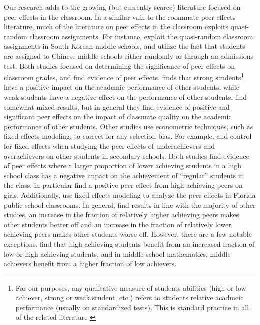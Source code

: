 \documentclass[12pt,letterpaper,english,fleqn,titlepage]{article}
\begin{document}
Our research adds to the growing (but currently scarce) literature focused on peer effects in the classroom.
In a similar vain to the roommate peer effects literature, much of the literature on peer effects in the classroom exploits quasi-random classroom assignments.
For instance, \citet{kang2007classroom} exploit the quasi-random classroom assignments in South Korean middle schools, and \citet{carman2012classroom} utilize the fact that students are assigned to Chinese middle schools either randomly or through an admissions test.
Both studies focused on determining the significance of peer effects on classroom grades, and find evidence of peer effects.
\citeauthor{kang2007classroom} finds that strong students\footnote{For our purposes, any qualitative measure of students abilities (high or low achiever, strong or weak student, etc.) refers to students relative acadmeic performance (usually on standardized tests). This is standard practice in all of the related literature \citep{carman2012classroom,burke2013classroom,kang2007classroom,schlosser2008inside,lavy2012good}} have a positive impact on the academic performance of other students, while weak students have a negative effect on the performance of other students. 
\citeauthor{carman2012classroom} find somewhat mixed results, but in general they find evidence of positive and significant peer effects on the impact of classmate quality on the academic performance of other students.
Other studies use econometric techniques, such as fixed effects modeling, to correct for any selection bias.
For example, \citet{schlosser2008inside} and \citet{lavy2012good} control for fixed effects when studying the peer effects of underachievers and overachievers on other students in secondary schools.
Both studies find evidence of peer effects where a larger proportion of lower achieving students in a high school class has a negative impact on the achievement of ``regular'' students in the class.
\citeauthor{lavy2012good} in particular find a positive peer effect from high achieving peers on girls.
Additionally, \citet{burke2013classroom} use fixed effects modeling to analyze the peer effects in Florida public school classrooms.
In general, \citeauthor{burke2013classroom} find results in line with the majority of other studies, an increase in the fraction of relatively higher achieving peers makes other students better off and an increase in the fraction of relatively lower achieving peers makes other students worse off.
However, there are a few notable exceptions.
\citeauthor{burke2013classroom} find that high achieving students benefit from an increased fraction of low or high achieving students, and in middle school mathematics, middle achievers benefit from a higher fraction of low achievers.
\end{document}

